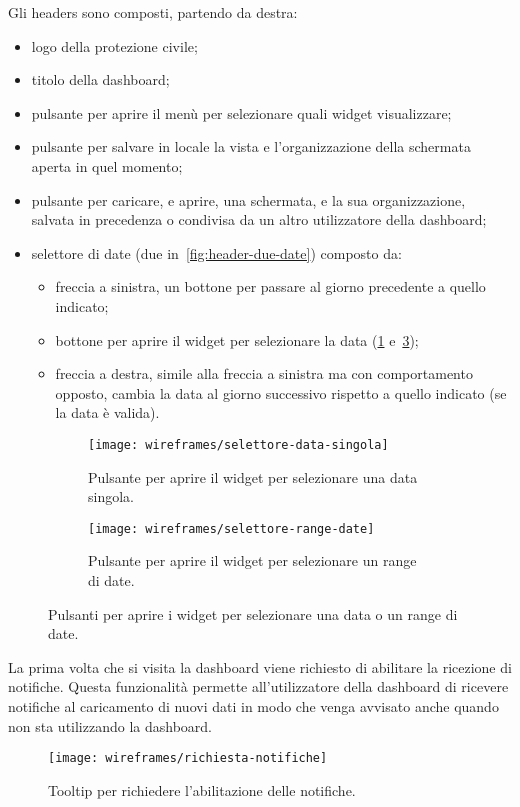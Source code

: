 Gli headers sono composti, partendo da destra:
\begin{itemize}
    \item logo della protezione civile;
    \item titolo della dashboard;
    \item pulsante per aprire il menù per selezionare quali widget visualizzare;
    \item pulsante per salvare in locale la vista e l'organizzazione della schermata aperta in quel momento;
    \item pulsante per caricare, e aprire, una schermata, e la sua organizzazione, salvata in precedenza o condivisa da un altro utilizzatore della dashboard;
    \item selettore di date (due in~\ref{fig:header-due-date}) composto da:
        \begin{itemize}
            \item freccia a sinistra, un bottone per passare al giorno precedente a quello indicato;
            \item bottone per aprire il widget per selezionare la data (\ref{fig:selettore-data-singola} e~\ref{fig:selettore-range-date});
            \item freccia a destra, simile alla freccia a sinistra ma con comportamento opposto, cambia la data al giorno successivo rispetto a quello indicato (se la data è valida).
        \end{itemize}
\end{itemize}

\begin{figure}[H]
    \begin{subfigure}[b]{0.5\textwidth}
        \centering
        \texttt{[image: wireframes/selettore-data-singola]}
        \caption{Pulsante per aprire il widget per selezionare una data singola.}\label{fig:selettore-data-singola}
    \end{subfigure}
\hfill
    \begin{subfigure}[b]{0.5\textwidth}
        \centering
        \texttt{[image: wireframes/selettore-range-date]}
        \caption{Pulsante per aprire il widget per selezionare un range di date.}\label{fig:selettore-range-date}
    \end{subfigure}
    \caption{Pulsanti per aprire i widget per selezionare una data o un range di date.}
\end{figure}

La prima volta che si visita la dashboard viene richiesto di abilitare la ricezione di notifiche. Questa funzionalità permette all'utilizzatore della dashboard di ricevere notifiche al caricamento di nuovi dati in modo che venga avvisato anche quando non sta utilizzando la dashboard.
\begin{figure}[H]
    \centering
    \texttt{[image: wireframes/richiesta-notifiche]}
    \caption{Tooltip per richiedere l'abilitazione delle notifiche.}\label{fig:richiesta-notifiche}
\end{figure}


